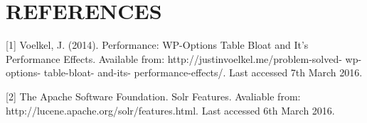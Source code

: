 \documentclass[journal,comsoc]{IEEEtran}
\begin{document}

\section{REFERENCES}

[1] Voelkel, J. (2014). Performance: WP-Options Table Bloat and It's Performance Effects. Available from: http://justinvoelkel.me/problem-solved- wp-options- table-bloat- and-its- performance-effects/. Last accessed 7th March 2016. \hfill \break

[2] The Apache Software Foundation. Solr Features. Avaliable from: http://lucene.apache.org/solr/features.html. Last accessed 6th March 2016. \hfill \break

\end{document}
